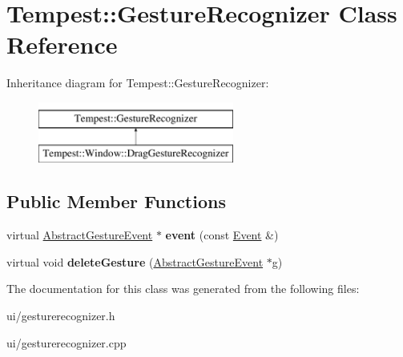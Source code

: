 \hypertarget{class_tempest_1_1_gesture_recognizer}{\section{Tempest\+:\+:Gesture\+Recognizer Class Reference}
\label{class_tempest_1_1_gesture_recognizer}
}
Inheritance diagram for Tempest\+:\+:Gesture\+Recognizer\+:\begin{figure}[H]
\begin{center}
\leavevmode
\includegraphics[height=2.000000cm]{class_tempest_1_1_gesture_recognizer}
\end{center}
\end{figure}
\subsection*{Public Member Functions}
\begin{DoxyCompactItemize}
\item 
\hypertarget{class_tempest_1_1_gesture_recognizer_a2bb32488d2e007e488a167f2b6bb1eba}{virtual \hyperlink{class_tempest_1_1_abstract_gesture_event}{Abstract\+Gesture\+Event} $\ast$ {\bfseries event} (const \hyperlink{class_tempest_1_1_event}{Event} \&)}\label{class_tempest_1_1_gesture_recognizer_a2bb32488d2e007e488a167f2b6bb1eba}

\item 
\hypertarget{class_tempest_1_1_gesture_recognizer_a996d9528baa3937a838afbb580b83539}{virtual void {\bfseries delete\+Gesture} (\hyperlink{class_tempest_1_1_abstract_gesture_event}{Abstract\+Gesture\+Event} $\ast$g)}\label{class_tempest_1_1_gesture_recognizer_a996d9528baa3937a838afbb580b83539}

\end{DoxyCompactItemize}


The documentation for this class was generated from the following files\+:\begin{DoxyCompactItemize}
\item 
ui/gesturerecognizer.\+h\item 
ui/gesturerecognizer.\+cpp\end{DoxyCompactItemize}
